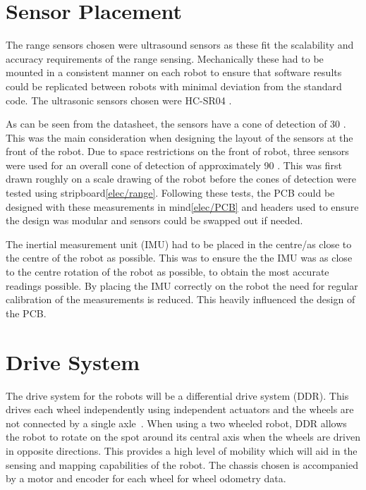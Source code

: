 \section{Sensor Placement}\label{mech/sensors}
The range sensors chosen were ultrasound sensors as these fit the scalability and accuracy requirements of the range sensing. Mechanically these had to be mounted in a consistent manner on each robot to ensure that software results could be replicated between robots with minimal deviation from the standard code. The ultrasonic sensors chosen were HC-SR04 .

As can be seen from the datasheet, the sensors have a cone of detection of 30 . This was the main consideration when designing the layout of the sensors at the front of the robot. Due to space restrictions on the front of robot, three sensors were used for an overall cone of detection of approximately 90 . This was first drawn roughly on a scale drawing of the robot before the cones of detection were tested using stripboard\ref{elec/range}. Following these tests, the PCB could be designed with these measurements in mind\ref{elec/PCB} and headers used to ensure the design was modular and sensors could be swapped out if needed. 

The inertial measurement unit (IMU) had to be placed in the centre/as close to the centre of the robot as possible. This was to ensure the the IMU was as close to the centre rotation of the robot as possible, to obtain the most accurate readings possible. By placing the IMU correctly on the robot the need for regular calibration of the measurements is reduced. This heavily influenced the design of the PCB. 


\section{Drive System}\label{mech/drive}

The drive system for the robots will be a differential drive system (DDR).
This drives each wheel independently using independent actuators and the
wheels are not connected by a single axle~\cite[p.~146]{braunl_embedded_2013}.
When using a two wheeled robot, DDR allows the
robot to rotate on the spot around its central axis when the wheels are
driven in opposite directions. This provides a high level of mobility which
will aid in the sensing and mapping capabilities of the robot. The chassis chosen is accompanied by a motor and encoder for each wheel for wheel odometry data.

